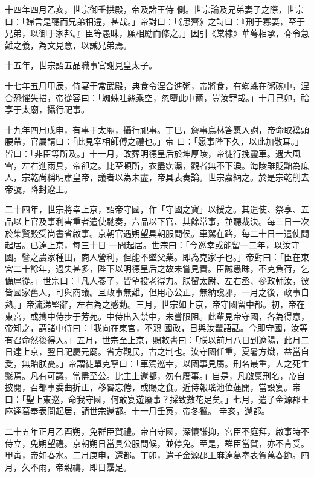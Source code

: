 \begin{pinyinscope}
 十四年四月乙亥，世宗御垂拱殿，帝及諸王侍
 側。世宗論及兄弟妻子之際，世宗曰：「婦言是聽而兄弟相違，甚哉。」帝對曰：「《思齊》之詩曰：『刑于寡妻，至于兄弟，以御于家邦。』臣等愚昧，願相勵而修之。」因引《棠棣》華萼相承，脊令急難之義，為文見意，以誡兄弟焉。



 十五年，世宗詔五品職事官謝見皇太子。



 十七年五月甲辰，侍宴于常武殿，典食令涅合進粥，帝將食，有蜘蛛在粥碗中，涅合恐懼失措，帝從容曰：「蜘蛛吐絲乘空，忽墮此中爾，豈汝罪哉。」十月己卯，祫享于太廟，攝行祀事。



 十九年四月戊申，有事于太廟，攝行祀事。丁巳，詹事烏林答愿入謝，帝命取襆頭腰帶，官屬請曰：「此見宰相師傅之禮也。」帝
 曰：「愿事陛下久，以此加敬耳。」皆曰：「非臣等所及。」十一月，改葬明德皇后於坤厚陵，帝徒行挽靈車。遇大風雪，左右進雨具，帝卻之。比至頓所，衣盡霑濕，觀者無不下淚。海陵雖貶黜為庶人，宗乾尚稱明肅皇帝，議者以為未盡，帝具表奏論。世宗嘉納之。於是宗乾削去帝號，降封遼王。



 二十四年，世宗將幸上京，詔帝守國，作「守國之寶」以授之。其遣使、祭享、五品以上官及事利害重者遣使馳奏，六品以下官、其餘常事，並聽裁決。每三日一次於集賢殿受尚書省啟事。京朝官遇朔望具朝服問侯。車駕在路，每二十日一遣使問起居。已達上京，每三十日
 一問起居。世宗曰：「今巡幸或能留一二年，以汝守國。譬之農家種田，商人營利，但能不墜父業。即為克家子也。」帝對曰：「臣在東宮二十餘年，過失甚多，陛下以明德皇后之故未嘗見責。臣誠愚昧，不克負荷，乞備扈從。」世宗曰：「凡人養子，皆望投老得力。朕留太尉、左右丞、參政輔汝，彼皆國家舊人，可與商議。且政事無難，但用心公正，無納讒邪，一月之後，政事自熟。」帝流涕堅辭，左右為之感動。三月，世宗如上京，帝守國留中都。初，帝在東宮，或攜中侍步于芳苑。中侍出入禁中，未嘗限阻。此輩見帝守國，各為得意，帝知之，謂諸中侍曰：「我向在東宮，不親
 國政，日與汝輩語話。今即守國，汝等有召命然後得入。」五月，世宗至上京，賜敕書曰：「朕以前月八日到遼陽，此月二日達上京，翌日祀慶元廟。省方觀民，古之制也。汝守國任重，夏暑方熾，益當自愛，無貽朕憂。」帝謂徒單克寧曰：「車駕巡幸，以國事見屬。刑名最重，人之死生繫焉。凡有可議，當盡至公。比主上還都，勿有廢事。」自是，凡啟稟刑名，帝自披閱，召都事委曲折正，移晷忘倦，或賜之食。近侍報瑤池位蓮開，當設宴。帝曰：「聖上東巡，命我守國，何敢宴遊廢事？採致數花足矣。」七月，遣子金源郡王麻達葛奉表問起居，請世宗還都。十一月壬寅，帝冬獵。
 辛亥，還都。



 二十五年正月乙酉朔，免群臣賀禮。帝自守國，深懷謙抑，宮臣不庭拜，啟事時不侍立，免朔望禮。京朝朔日當具公服問候，並停免。至是，群臣當賀，亦不肯受。甲寅，帝如春水。二月庚申，還都。丁卯，遣子金源郡王麻達葛奉表賀萬春節。四月，久不雨，帝親禱，即日霑足。




\end{pinyinscope}
